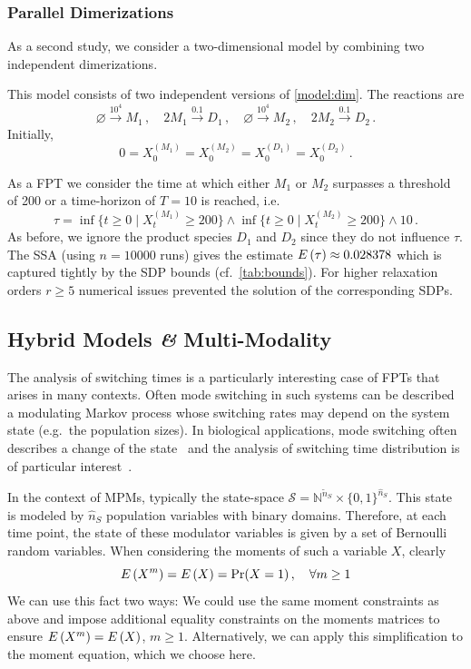 \subsubsection*{Parallel Dimerizations}
As a second study, we consider a two-dimensional model by combining two
independent dimerizations.
\begin{model}\label{model:double_dim} This model consists of two
  independent versions of \autoref{model:dim}. The
  reactions are
  \[
    \varnothing\xrightarrow{10^4}M_1\,,\quad
    2M_1\xrightarrow{0.1}D_1\,,\quad
    \varnothing\xrightarrow{10^4}M_2\,,\quad
    2M_2\xrightarrow{0.1}D_2\,.
  \]
  Initially, \[0=X_0^{(M_1)}=X_0^{(M_2)}=X_0^{(D_1)}=X_0^{(D_2)}\,.\]
\end{model}
As a \ac{FPT} we consider the time at which either $M_1$ or $M_2$
surpasses a threshold of \num{200} or a time-horizon of $T=10$
is reached, i.e.
\[ \tau=\inf\{t\geq 0\mid X_t^{(M_1)} \geq 200\}\land \inf\{t\geq
  0\mid X_t^{(M_2)} \geq 200\}\land 10\,.
\]
As before, we ignore the product species $D_1$ and $D_2$ since they
do not influence $\tau$.
The \ac{SSA}   (using $n=\num{10000}$ runs) gives the estimate
${E}\left(\tau\right)\approx {0.028378}$ %
which is captured tightly by the \ac{SDP} bounds (cf.\ \autoref{tab:bounds}).
For higher relaxation orders $r \geq 5$  numerical issues prevented
the solution of the
corresponding \acp{SDP}.

\subsection{Hybrid Models \textit{\&} Multi-Modality}
The analysis of switching times is a particularly interesting case of
\acp{FPT} that
arises in many   contexts.
Often mode switching in such systems can be described a modulating
Markov process
whose switching rates may depend on the system state (e.g.\ the
population sizes).
In biological applications, mode switching often describes a change of the
 state~\parencite{hasenauer2014method,stekel2008strong}
and the analysis of
switching time distribution is of particular
interest~\parencite{spieler2014model,barzel2008calculation}.

In the context of \acp{MPM}, typically the state-space $\mathcal{S}=
\mathbb{N}^{\tilde{n}_S}\times {\{0,1\}}^{\hat{n}_S}$.
This state is modeled by  $\hat{n}_S$ population variables with
binary domains. Therefore, at each time point, the state of these
modulator variables
is given by a set of Bernoulli random variables.
When considering the moments of
such a variable $X$, clearly
\[
  {E}\left(X^m\right)={E}\left(X\right)=\Pr(X=1)\,,\quad \forall m\geq 1
\]
We can use this fact two ways: We could use the same moment
constraints
as above and impose additional equality constraints on the moments matrices
to ensure ${E}\left(X^m\right)={E}\left(X\right)$, $m\geq 1$.
Alternatively, we can apply this simplification to the moment
equation, which we choose here.

